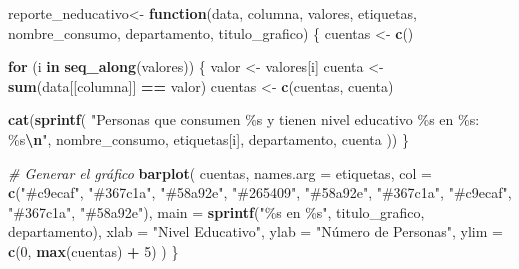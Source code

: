 \documentclass[
]{article}
\newenvironment{Shaded}{\begin{snugshade}}{\end{snugshade}}
\newcommand{\AttributeTok}[1]{\textcolor[rgb]{0.13,0.29,0.53}{#1}}
\newcommand{\CommentTok}[1]{\textcolor[rgb]{0.56,0.35,0.01}{\textit{#1}}}
\newcommand{\ControlFlowTok}[1]{\textcolor[rgb]{0.13,0.29,0.53}{\textbf{#1}}}
\newcommand{\DecValTok}[1]{\textcolor[rgb]{0.00,0.00,0.81}{#1}}
\newcommand{\FunctionTok}[1]{\textcolor[rgb]{0.13,0.29,0.53}{\textbf{#1}}}
\newcommand{\NormalTok}[1]{#1}
\newcommand{\OtherTok}[1]{\textcolor[rgb]{0.56,0.35,0.01}{#1}}
\newcommand{\SpecialCharTok}[1]{\textcolor[rgb]{0.81,0.36,0.00}{\textbf{#1}}}
\newcommand{\StringTok}[1]{\textcolor[rgb]{0.31,0.60,0.02}{#1}}
\begin{document}
\begin{Shaded}
\begin{Highlighting}[]
\NormalTok{reporte\_neducativo}\OtherTok{\textless{}{-}} \ControlFlowTok{function}\NormalTok{(data, columna, valores, etiquetas, nombre\_consumo, departamento, titulo\_grafico) \{}
\NormalTok{  cuentas }\OtherTok{\textless{}{-}} \FunctionTok{c}\NormalTok{()}
  
  \ControlFlowTok{for}\NormalTok{ (i }\ControlFlowTok{in} \FunctionTok{seq\_along}\NormalTok{(valores)) \{}
\NormalTok{    valor }\OtherTok{\textless{}{-}}\NormalTok{ valores[i]}
\NormalTok{    cuenta }\OtherTok{\textless{}{-}} \FunctionTok{sum}\NormalTok{(data[[columna]] }\SpecialCharTok{==}\NormalTok{ valor)}
\NormalTok{    cuentas }\OtherTok{\textless{}{-}} \FunctionTok{c}\NormalTok{(cuentas, cuenta)}
    
    \FunctionTok{cat}\NormalTok{(}\FunctionTok{sprintf}\NormalTok{(}
      \StringTok{"Personas que consumen \%s y tienen nivel educativo \%s en \%s: \%s}\SpecialCharTok{\textbackslash{}n}\StringTok{"}\NormalTok{, }
\NormalTok{      nombre\_consumo, etiquetas[i], departamento, cuenta}
\NormalTok{    ))}
\NormalTok{  \}}
  
  \CommentTok{\# Generar el gráfico}
  \FunctionTok{barplot}\NormalTok{(}
\NormalTok{    cuentas,}
    \AttributeTok{names.arg =}\NormalTok{ etiquetas,}
    \AttributeTok{col =} \FunctionTok{c}\NormalTok{(}\StringTok{"\#c9ecaf"}\NormalTok{, }\StringTok{"\#367c1a"}\NormalTok{, }\StringTok{"\#58a92e"}\NormalTok{, }\StringTok{"\#265409"}\NormalTok{, }\StringTok{"\#58a92e"}\NormalTok{, }\StringTok{"\#367c1a"}\NormalTok{, }\StringTok{"\#c9ecaf"}\NormalTok{, }\StringTok{"\#367c1a"}\NormalTok{, }\StringTok{"\#58a92e"}\NormalTok{),}
    \AttributeTok{main =} \FunctionTok{sprintf}\NormalTok{(}\StringTok{"\%s en \%s"}\NormalTok{, titulo\_grafico, departamento),}
    \AttributeTok{xlab =} \StringTok{"Nivel Educativo"}\NormalTok{,}
    \AttributeTok{ylab =} \StringTok{"Número de Personas"}\NormalTok{,}
    \AttributeTok{ylim =} \FunctionTok{c}\NormalTok{(}\DecValTok{0}\NormalTok{, }\FunctionTok{max}\NormalTok{(cuentas) }\SpecialCharTok{+} \DecValTok{5}\NormalTok{)}
\NormalTok{  )}
\NormalTok{\}}


\end{Highlighting}
\end{Shaded}
\end{document}
